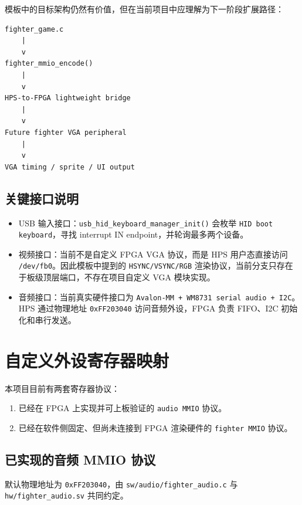 \documentclass[12pt,a4paper]{ctexart}
\begin{document}
模板中的目标架构仍然有价值，但在当前项目中应理解为下一阶段扩展路径：

\begin{lstlisting}[style=fighterstyle]
fighter_game.c
    |
    v
fighter_mmio_encode()
    |
    v
HPS-to-FPGA lightweight bridge
    |
    v
Future fighter VGA peripheral
    |
    v
VGA timing / sprite / UI output
\end{lstlisting}

\subsection{关键接口说明}

\begin{itemize}
  \item USB 输入接口：\texttt{usb\_hid\_keyboard\_manager\_init()} 会枚举 \texttt{HID boot keyboard}，寻找 interrupt IN endpoint，并轮询最多两个设备。
  \item 视频接口：当前不是自定义 FPGA VGA 协议，而是 HPS 用户态直接访问 \texttt{/dev/fb0}。因此模板中提到的 \texttt{HSYNC/VSYNC/RGB} 渲染协议，当前分支只存在于板级顶层端口，不存在项目自定义 VGA 模块实现。
  \item 音频接口：当前真实硬件接口为 \texttt{Avalon-MM + WM8731 serial audio + I2C}。HPS 通过物理地址 \texttt{0xFF203040} 访问音频外设，FPGA 负责 FIFO、I2C 初始化和串行发送。
\end{itemize}

\section{自定义外设寄存器映射}

本项目目前有两套寄存器协议：

\begin{enumerate}
  \item 已经在 FPGA 上实现并可上板验证的 \texttt{audio MMIO} 协议。
  \item 已经在软件侧固定、但尚未连接到 FPGA 渲染硬件的 \texttt{fighter MMIO} 协议。
\end{enumerate}

\subsection{已实现的音频 MMIO 协议}

默认物理地址为 \texttt{0xFF203040}，由 \texttt{sw/audio/fighter\_audio.c} 与 \texttt{hw/fighter\_audio.sv} 共同约定。
\end{document}
